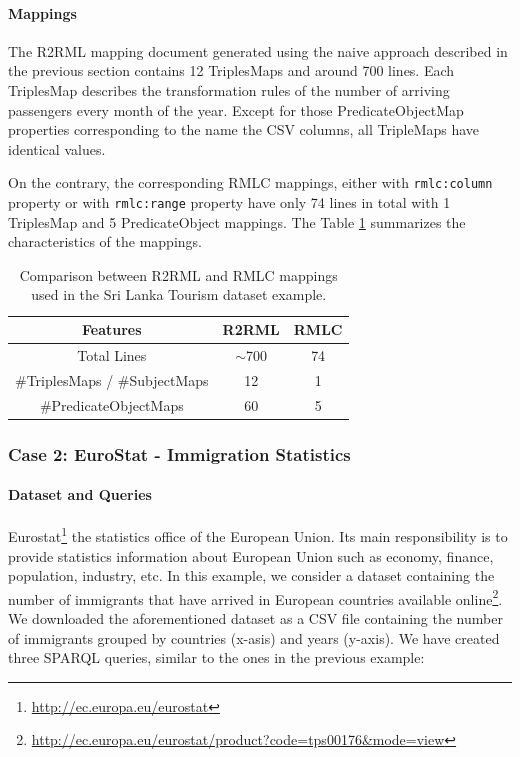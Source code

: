 \noindent\paragraph{Mappings}
The R2RML mapping document generated using the naive approach described in the previous section contains 12 TriplesMaps and around 700 lines. Each TriplesMap describes the transformation rules of the number of arriving passengers every month of the year. Except for those PredicateObjectMap properties corresponding to the name the CSV columns, all TripleMaps have identical values. 

On the contrary, the corresponding RMLC mappings, either with \texttt{rmlc:column} property or with \texttt{rmlc:range} property have only 74 lines in total with 1 TriplesMap and 5 PredicateObject mappings. The Table \ref{table:compare1} summarizes the characteristics of the mappings.

\begin{table}[tbp]
\caption[R2RML vs RMLC in Sri Lanka dataset]{Comparison between R2RML and RMLC mappings used in the Sri Lanka Tourism dataset example.}
\label{table:compare1}
\begin{tabular}{c|c|c}
\hline
\textbf{Features} & \textbf{R2RML}   & \textbf{RMLC}  \\ \hline
Total Lines   & $\sim$700 & 74 \\ 
\#TriplesMaps / \#SubjectMaps     & 12                & 1           \\
\#PredicateObjectMaps  & 60              & 5            \\ \hline
\end{tabular}
\end{table}

\subsubsection{Case 2: EuroStat - Immigration Statistics}
\noindent\paragraph{Dataset and Queries} Eurostat\footnote{\url{http://ec.europa.eu/eurostat}} the statistics office of the European Union. Its main responsibility is to provide statistics information about European Union such as economy, finance, population, industry, etc. In this example, we consider a dataset containing the number of immigrants that have arrived in European countries available online\footnote{\url{http://ec.europa.eu/eurostat/product?code=tps00176&mode=view}}. We downloaded the aforementioned dataset as a CSV file containing the number of immigrants grouped by countries (x-asis) and years (y-axis). We have created three SPARQL queries, similar to the ones in the previous example:

